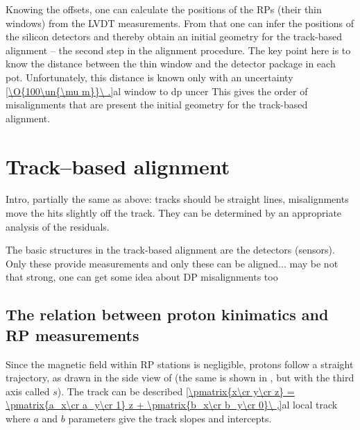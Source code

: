 


Knowing the offsets, one can calculate the positions of the RPs (their thin windows) from the LVDT measurements. From that one can infer the positions of the silicon detectors and thereby obtain an initial geometry for the track-based alignment -- the second step in the alignment procedure. The key point here is to know the distance between the thin window and the detector package in each pot. Unfortunately, this distance is known only with an uncertainty
\eqref{\O{100\un{\mu m}}\ .}{al window to dp uncer}
This gives the order of misalignments that are present the initial geometry for the track-based alignment.

\section[al tb]{Track--based alignment}

\> Intro, partially the same as above: tracks should be straight lines, misalignments move the hits slightly off the track. They can be determined by an appropriate analysis of the residuals. 

\> The basic structures in the track-based alignment are the detectors (sensors). Only these provide measurements and only these can be aligned... may be not that strong, one can get some idea about DP misalignments too

\subsection[al psi]{The relation between proton kinimatics and RP measurements}

Since the magnetic field within RP stations is negligible, protons follow a straight trajectory, as drawn in the side view of  (the same is shown in , but with the third axis called $s$). The track can be described
\eqref{\pmatrix{x\cr y\cr z} = \pmatrix{a_x\cr a_y\cr 1} z + \pmatrix{b_x\cr b_y\cr 0}\ ,}{al local track}
where $a$ and $b$ parameters give the track slopes and intercepts.

